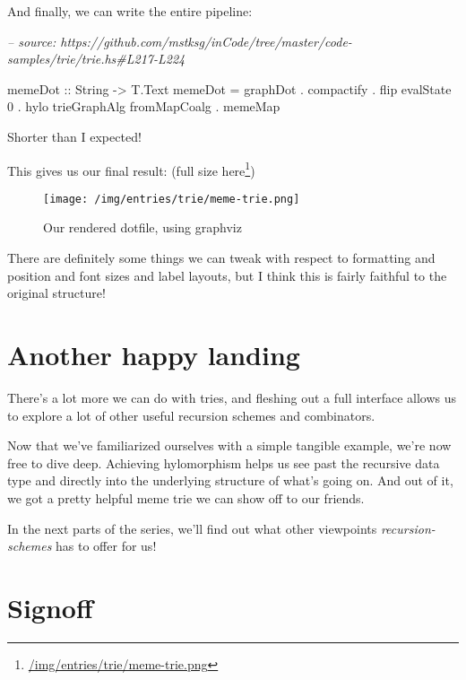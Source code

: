 \documentclass[]{article}
\newenvironment{Shaded}{}{}
\newcommand{\CommentTok}[1]{\textcolor[rgb]{0.38,0.63,0.69}{\textit{#1}}}
\newcommand{\DataTypeTok}[1]{\textcolor[rgb]{0.56,0.13,0.00}{#1}}
\newcommand{\DecValTok}[1]{\textcolor[rgb]{0.25,0.63,0.44}{#1}}
\newcommand{\FunctionTok}[1]{\textcolor[rgb]{0.02,0.16,0.49}{#1}}
\newcommand{\NormalTok}[1]{#1}
\newcommand{\OtherTok}[1]{\textcolor[rgb]{0.00,0.44,0.13}{#1}}
\renewcommand{\href}[2]{#2\footnote{\url{#1}}}
\begin{document}
And finally, we can write the entire pipeline:

\begin{Shaded}
\begin{Highlighting}[]
\CommentTok{-- source: https://github.com/mstksg/inCode/tree/master/code-samples/trie/trie.hs#L217-L224}

\NormalTok{memeDot}
\OtherTok{    ::} \DataTypeTok{String}
    \OtherTok{->} \DataTypeTok{T.Text}
\NormalTok{memeDot }\FunctionTok{=}\NormalTok{ graphDot}
        \FunctionTok{.}\NormalTok{ compactify}
        \FunctionTok{.}\NormalTok{ flip evalState }\DecValTok{0}
        \FunctionTok{.}\NormalTok{ hylo trieGraphAlg fromMapCoalg}
        \FunctionTok{.}\NormalTok{ memeMap}
\end{Highlighting}
\end{Shaded}

Shorter than I expected!

This gives us our final result: (\href{/img/entries/trie/meme-trie.png}{full
size here})

\begin{figure}
\centering
\texttt{[image: /img/entries/trie/meme-trie.png]}
\caption{Our rendered dotfile, using graphviz}
\end{figure}

There are definitely some things we can tweak with respect to formatting and
position and font sizes and label layouts, but I think this is fairly faithful
to the original structure!

\hypertarget{another-happy-landing}{%
\section{Another happy landing}\label{another-happy-landing}}

There's a lot more we can do with tries, and fleshing out a full interface
allows us to explore a lot of other useful recursion schemes and combinators.

Now that we've familiarized ourselves with a simple tangible example, we're now
free to dive deep. Achieving hylomorphism helps us see past the recursive data
type and directly into the underlying structure of what's going on. And out of
it, we got a pretty helpful meme trie we can show off to our friends.

In the next parts of the series, we'll find out what other viewpoints
\emph{recursion-schemes} has to offer for us!

\hypertarget{signoff}{%
\section{Signoff}\label{signoff}}
\end{document}
